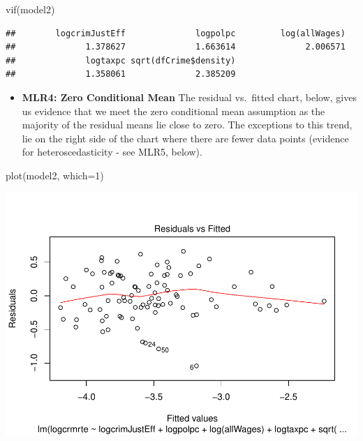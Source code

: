 \documentclass[]{article}
\newenvironment{Shaded}{}{}
\newcommand{\DataTypeTok}[1]{#1}
\newcommand{\DecValTok}[1]{#1}
\newcommand{\KeywordTok}[1]{\textcolor[rgb]{0.00,0.00,1.00}{#1}}
\newcommand{\NormalTok}[1]{#1}
\providecommand{\tightlist}{%
  \setlength{\itemsep}{0pt}\setlength{\parskip}{0pt}}
\begin{document}
\begin{Shaded}
\begin{Highlighting}[]
\KeywordTok{vif}\NormalTok{(model2)}
\end{Highlighting}
\end{Shaded}

\begin{verbatim}
##        logcrimJustEff              logpolpc         log(allWages) 
##              1.378627              1.663614              2.006571 
##              logtaxpc sqrt(dfCrime$density) 
##              1.358061              2.385209
\end{verbatim}

\begin{itemize}
\tightlist
\item
  \textbf{MLR4: Zero Conditional Mean} The residual vs.~fitted chart,
  below, gives us evidence that we meet the zero conditional mean
  assumption as the majority of the residual means lie close to zero.
  The exceptions to this trend, lie on the right side of the chart where
  there are fewer data points (evidence for heteroscedasticity - see
  MLR5, below).
\end{itemize}

\begin{Shaded}
\begin{Highlighting}[]
\KeywordTok{plot}\NormalTok{(model2, }\DataTypeTok{which=}\DecValTok{1}\NormalTok{)}
\end{Highlighting}
\end{Shaded}

\includegraphics{Bagnard_Gaustad_Hartman_Leung_Lab_3_files/figure-latex/unnamed-chunk-88-1.pdf}
\end{document}
